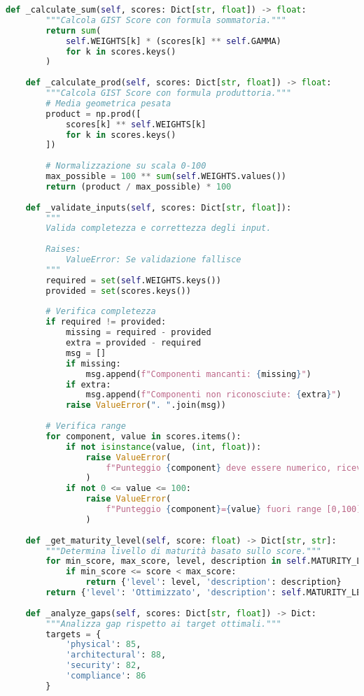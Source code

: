 \begin{lstlisting}[language=Python, caption={Implementazione completa GIST Calculator con validazione e reporting}]
    def _calculate_sum(self, scores: Dict[str, float]) -> float:
        """Calcola GIST Score con formula sommatoria."""
        return sum(
            self.WEIGHTS[k] * (scores[k] ** self.GAMMA)
            for k in scores.keys()
        )
    
    def _calculate_prod(self, scores: Dict[str, float]) -> float:
        """Calcola GIST Score con formula produttoria."""
        # Media geometrica pesata
        product = np.prod([
            scores[k] ** self.WEIGHTS[k]
            for k in scores.keys()
        ])
        
        # Normalizzazione su scala 0-100
        max_possible = 100 ** sum(self.WEIGHTS.values())
        return (product / max_possible) * 100
    
    def _validate_inputs(self, scores: Dict[str, float]):
        """
        Valida completezza e correttezza degli input.
        
        Raises:
            ValueError: Se validazione fallisce
        """
        required = set(self.WEIGHTS.keys())
        provided = set(scores.keys())
        
        # Verifica completezza
        if required != provided:
            missing = required - provided
            extra = provided - required
            msg = []
            if missing:
                msg.append(f"Componenti mancanti: {missing}")
            if extra:
                msg.append(f"Componenti non riconosciute: {extra}")
            raise ValueError(". ".join(msg))
        
        # Verifica range
        for component, value in scores.items():
            if not isinstance(value, (int, float)):
                raise ValueError(
                    f"Punteggio {component} deve essere numerico, ricevuto {type(value)}"
                )
            if not 0 <= value <= 100:
                raise ValueError(
                    f"Punteggio {component}={value} fuori range [0,100]"
                )
    
    def _get_maturity_level(self, score: float) -> Dict[str, str]:
        """Determina livello di maturità basato sullo score."""
        for min_score, max_score, level, description in self.MATURITY_LEVELS:
            if min_score <= score < max_score:
                return {'level': level, 'description': description}
        return {'level': 'Ottimizzato', 'description': self.MATURITY_LEVELS[-1][3]}
    
    def _analyze_gaps(self, scores: Dict[str, float]) -> Dict:
        """Analizza gap rispetto ai target ottimali."""
        targets = {
            'physical': 85,
            'architectural': 88,
            'security': 82,
            'compliance': 86
        }
        

\end{lstlisting}
